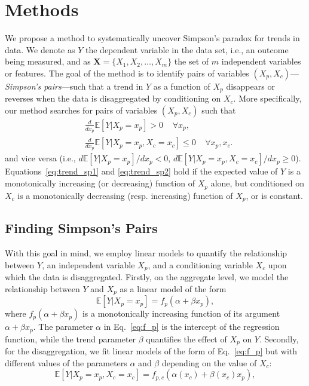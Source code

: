 \section{Methods}
\label{sec:methods}

We propose a method to systematically uncover Simpson's paradox for trends in data. We denote as $Y$ the dependent variable in the data set, i.e., an outcome being measured, and as $\mathbf{X} = \{X_1, X_2,\dots,X_m\}$ the set of $m$ independent variables or features. The goal of the method is to identify pairs of variables $(X_p, X_c)$---\emph{Simpson's pairs}---such that %
a trend in $Y$ as a function of $X_p$ disappears or reverses when the data is disaggregated by conditioning on $X_c$. %
More specifically, our method searches for pairs of variables $(X_p, X_c)$ such that
\begin{align}
	&\frac{d}{dx_p}\mathbb{E}[Y|X_p = x_p] > 0\;\;\;\; \forall x_p, \label{eq:trend_sp1} \\
	&\frac{d}{dx_p}\mathbb{E}[Y|X_p = x_p, X_c = x_c] \leq 0 \;\;\;\; \forall x_p, x_c.
	\label{eq:trend_sp2}
\end{align}
and vice versa (i.e., $d\mathbb{E}[Y|X_p = x_p]/dx_p < 0$, $d\mathbb{E}[Y|X_p = x_p, X_c = x_c]/dx_p \geq 0$). Equations~\eqref{eq:trend_sp1} and \eqref{eq:trend_sp2} hold if the expected value of $Y$ is a monotonically increasing (or decreasing) function of $X_p$ alone, but conditioned on $X_c$ is a monotonically decreasing (resp. increasing) function of $X_p$, or is constant.

\subsection{Finding Simpson's Pairs}
With this goal in mind, we employ linear models to quantify the relationship between $Y$, an independent variable $X_p$, and a conditioning variable $X_c$ upon which the data is disaggregated. Firstly, on the aggregate level, we model the relationship between $Y$ and $X_p$ as a linear model of the form
\begin{equation}
	\mathbb{E}[Y|X_p = x_p] = f_p(\alpha + \beta x_p),
	\label{eq:f_p}
\end{equation}
where $f_p(\alpha + \beta x_p)$ is a monotonically increasing function of its argument $\alpha + \beta x_p$. The parameter $\alpha$ in Eq.~\eqref{eq:f_p} is the intercept of the regression function, while the trend parameter $\beta $ quantifies the effect of $X_p$ on $Y$. Secondly, for the disaggregation, we fit linear models of the form of Eq.~\eqref{eq:f_p} but with different values of the parameters $\alpha$ and $\beta $ depending on the value of $X_c$:	
\begin{equation}
	\mathbb{E}[Y|X_p = x_p, X_c = x_c] = f_{p,c}(\alpha(x_c) + \beta (x_c)x_p),
	\label{eq:f_pc}
\end{equation}

